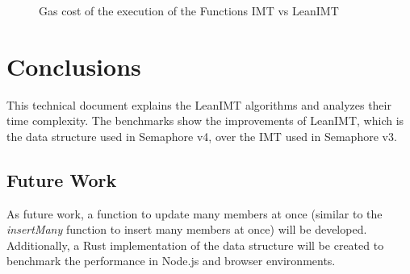 \documentclass{article}
\begin{document}
\begin{figure}[H]
    \centering
    \datatable
    \caption{Gas cost of the execution of the Functions IMT vs LeanIMT}
    \label{fig:gas-price-functions-bar}
\end{figure}


\section{Conclusions}

This technical document explains the LeanIMT algorithms and analyzes their time complexity. The benchmarks show the improvements of LeanIMT, which is the data structure used in Semaphore v4, over the IMT used in Semaphore v3.


\subsection{Future Work}

As future work, a function to update many members at once (similar to the \textit{insertMany} function to insert many members at once) will be developed. Additionally, a Rust implementation of the data structure will be created to benchmark the performance in Node.js and browser environments.

\sloppy

\printbibliography

\end{document}

